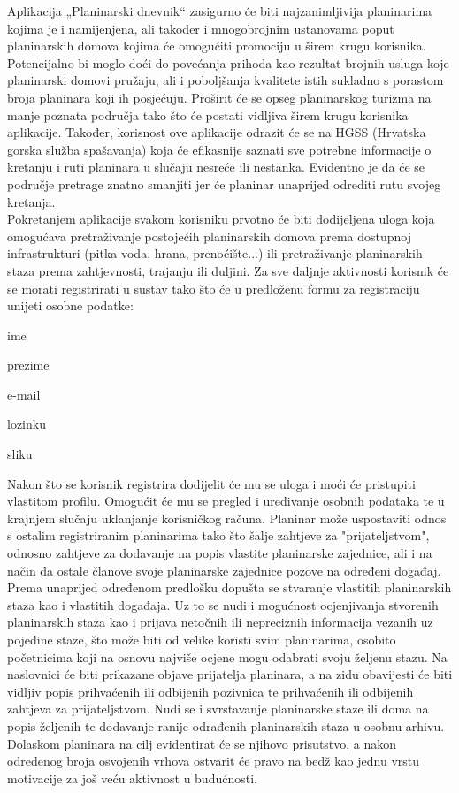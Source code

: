 		Aplikacija „Planinarski dnevnik“ zasigurno će biti najzanimljivija planinarima kojima je i namijenjena, ali također i mnogobrojnim ustanovama poput planinarskih domova kojima će omogućiti promociju u širem krugu korisnika. Potencijalno bi moglo doći do povećanja prihoda kao rezultat brojnih usluga koje planinarski domovi pružaju, ali i poboljšanja kvalitete istih sukladno s porastom broja planinara koji ih posjećuju. Proširit će se opseg planinarskog turizma na manje poznata područja tako što će postati vidljiva širem krugu korisnika aplikacije. Također, korisnost ove aplikacije odrazit će se na HGSS (Hrvatska gorska služba spašavanja) koja će efikasnije saznati sve potrebne informacije o kretanju i ruti planinara u slučaju nesreće ili nestanka. Evidentno je da će se područje pretrage znatno smanjiti jer će planinar unaprijed odrediti rutu svojeg kretanja.\\
		
		Pokretanjem aplikacije svakom korisniku prvotno će biti dodijeljena uloga  koja omogućava pretraživanje postojećih planinarskih domova prema dostupnoj infrastrukturi (pitka voda, hrana, prenoćište...) ili
		pretraživanje planinarskih staza prema zahtjevnosti, trajanju ili duljini. Za sve daljnje aktivnosti korisnik će se morati registrirati u sustav tako što će u predloženu formu za registraciju unijeti osobne podatke:
		\begin{packed_item}
			\item ime
			\item prezime
			\item e-mail
			\item lozinku
			\item sliku	
		\end{packed_item}
	 
		Nakon što se korisnik registrira dodijelit će mu se uloga  i moći će pristupiti vlastitom profilu. Omogućit će mu se pregled i uređivanje osobnih podataka te u krajnjem slučaju uklanjanje korisničkog računa. Planinar može uspostaviti odnos s ostalim registriranim planinarima tako što šalje zahtjeve za "prijateljstvom", odnosno zahtjeve za dodavanje na popis vlastite planinarske zajednice, ali i na način da ostale članove svoje planinarske zajednice pozove na određeni događaj. Prema unaprijed određenom predlošku dopušta se stvaranje vlastitih planinarskih staza kao i vlastitih događaja. Uz to se nudi i mogućnost ocjenjivanja stvorenih planinarskih staza kao i prijava netočnih ili nepreciznih informacija vezanih uz pojedine staze, što može biti od velike koristi svim planinarima, osobito početnicima koji na osnovu najviše ocjene mogu odabrati svoju željenu stazu. Na naslovnici će biti prikazane objave prijatelja planinara, a na zidu obavijesti će biti vidljiv popis prihvaćenih ili odbijenih pozivnica te prihvaćenih ili odbijenih zahtjeva za prijateljstvom. Nudi se i svrstavanje planinarske staze ili doma na popis željenih te dodavanje ranije odrađenih planinarskih staza u osobnu arhivu. Dolaskom planinara na cilj evidentirat će se njihovo prisutstvo, a nakon određenog broja osvojenih vrhova ostvarit će pravo na bedž kao jednu vrstu motivacije za još veću aktivnost u budućnosti. \\
		
